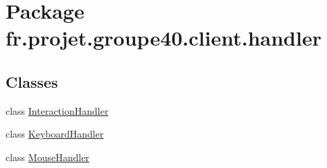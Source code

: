 \hypertarget{namespacefr_1_1projet_1_1groupe40_1_1client_1_1handler}{}\section{Package fr.\+projet.\+groupe40.\+client.\+handler}
\label{namespacefr_1_1projet_1_1groupe40_1_1client_1_1handler}
\subsection*{Classes}
\begin{DoxyCompactItemize}
\item 
class \hyperlink{classfr_1_1projet_1_1groupe40_1_1client_1_1handler_1_1_interaction_handler}{Interaction\+Handler}
\item 
class \hyperlink{classfr_1_1projet_1_1groupe40_1_1client_1_1handler_1_1_keyboard_handler}{Keyboard\+Handler}
\item 
class \hyperlink{classfr_1_1projet_1_1groupe40_1_1client_1_1handler_1_1_mouse_handler}{Mouse\+Handler}
\end{DoxyCompactItemize}
